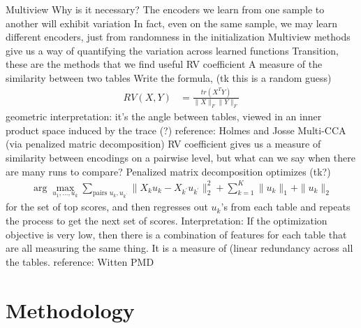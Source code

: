 \documentclass[11pt]{article}
\begin{document}
\begin{outline}
\1 Multiview
  \2 Why is it necessary?
    \3 The encoders we learn from one sample to another will exhibit variation
      \4 In fact, even on the same sample, we may learn different encoders, just
      from randomness in the initialization
    \3 Multiview methods give us a way of quantifying the variation across
    learned functions
  \2 Transition, these are the methods that we find useful
  \2 RV coefficient
    \3 A measure of the similarity between two tables
    \3 Write the formula, (tk this is a random guess)
    \begin{align}
      RV\left(X, Y\right) &= \frac{tr\left(X^T Y\right)}{\|X\|_{F}\|Y\|_{F}}
    \end{align}
    \3 geometric interpretation: it's the angle between tables, viewed in an
    inner product space induced by the trace (?)
    \3 reference: Holmes and Josse
  \2 Multi-CCA (via penalized matric decomposition)
    \3 RV coefficient gives us a measure of similarity between encodings on a
    pairwise level, but what can we say when there are many runs to compare?
    \3 Penalized matrix decomposition optimizes (tk?)
    \begin{align}
      \arg\max_{u_1, \dots, u_{k}} \sum_{\text{pairs } u_{k}, u_{k^{\prime}}} \|X_{k}u_{k} - X_{k^{\prime}}u_{k^{\prime}}\|_{2}^{2} + \sum_{k = 1}^{K} \|u_{k}\|_{1} + \|u_{k}\|_{2}
    \end{align}
    for the set of top scores, and then regresses out $u_{k}$'s from each table
    and repeats the process to get the next set of scores.
    \3 Interpretation: If the optimization objective is very low, then there is
    a combination of features for each table that are all measuring the same
    thing. It is a measure of (linear redundancy across all the tables.
    \3 reference: Witten PMD
\end{outline}

\section{Methodology}
\end{document}

